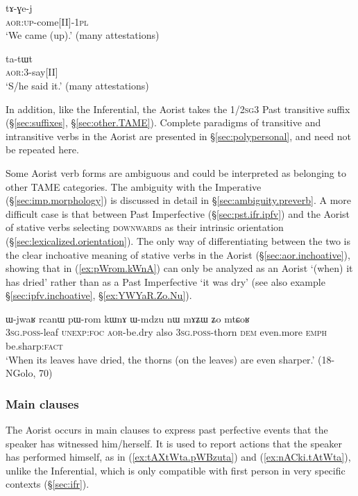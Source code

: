 \begin{exe}
\ex \label{ex:tAGej}
 \gll tɤ-ɣe-j \\
\textsc{aor}:\textsc{up}-come[II]-\textsc{1pl} \\
\glt `We came (up).' (many attestations)
\end{exe}

\begin{exe}
\ex \label{ex:tatWt}
 \gll ta-tɯt \\
\textsc{aor}:3\flobv{}-say[II]  \\
\glt `S/he said it.' (many attestations)
\end{exe}

In addition, like the Inferential, the Aorist takes the 1/2\textsc{sg}\fl{}3 Past transitive suffix  (§\ref{sec:suffixes}, §\ref{sec:other.TAME}). Complete paradigms of transitive and intransitive verbs in the Aorist are presented in §\ref{sec:polypersonal}, and need not be repeated here.

Some Aorist verb forms are ambiguous and could be interpreted as belonging to other TAME categories. The ambiguity with the Imperative (§\ref{sec:imp.morphology}) is discussed in detail in §\ref{sec:ambiguity.preverb}. A more difficult case is that between Past Imperfective  (§\ref{sec:pst.ifr.ipfv}) and the Aorist of stative verbs selecting \textsc{downwards} as their intrinsic orientation (§\ref{sec:lexicalized.orientation}). The only way of differentiating between the two is the clear inchoative meaning of stative verbs in the Aorist (§\ref{sec:aor.inchoative}), showing that  in (\ref{ex:pWrom.kWnA}) can only be analyzed as an Aorist `(when) it has dried' rather than as a Past Imperfective `it was dry' (see also example §\ref{sec:ipfv.inchoative},  §\ref{ex:YWYaR.Zo.Nu}).

\begin{exe}
\ex \label{ex:pWrom.kWnA}
 \gll  ɯ-jwaʁ rcanɯ pɯ-rom kɯnɤ ɯ-mdzu nɯ mɤʑɯ ʑo mtɕoʁ \\
\textsc{3sg}.\textsc{poss}-leaf \textsc{unexp}:\textsc{foc} \textsc{aor}-be.dry also \textsc{3sg}.\textsc{poss}-thorn \textsc{dem} even.more \textsc{emph} be.sharp:\textsc{fact} \\
\glt `When its leaves have dried, the thorns (on the leaves) are even sharper.' (18-NGolo, 70)
\end{exe}

\subsubsection{Main clauses}   \label{sec:aor.main}
The Aorist occurs in main clauses to express past perfective events that the speaker has witnessed him/herself. It is used to report actions that the speaker has performed himself, as in (\ref{ex:tAXtWta.pWBzuta}) and (\ref{ex:nACki.tAtWta}), unlike the Inferential, which is only compatible with first person in very specific contexts (§\ref{sec:ifr}).

